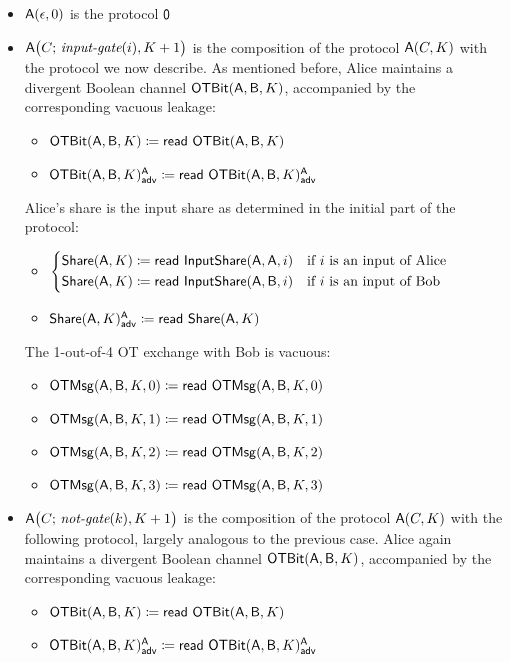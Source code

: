 \begin{itemize}
\item $\mathsf{A}(\epsilon,0)$ is the protocol $\mathsf{0}$
\item $\mathsf{A}\big(C; \, \textit{input-gate}(i),K+1\big)$ is the composition of the protocol $\mathsf{A}(C,K)$ with the protocol we now describe. As mentioned before, Alice maintains a divergent Boolean channel $\mathsf{OTBit}(\mathsf{A},\mathsf{B},K)$, accompanied by the corresponding vacuous leakage:
\begin{itemize}
\item $\mathsf{OTBit}(\mathsf{A},\mathsf{B},K) \coloneqq \mathsf{read} \ \mathsf{OTBit}(\mathsf{A},\mathsf{B},K)$
\item {\color{blue} $\mathsf{OTBit}(\mathsf{A},\mathsf{B},K)^{\mathsf{A}}_{\mathsf{adv}} \coloneqq \mathsf{read} \ \mathsf{OTBit}(\mathsf{A},\mathsf{B},K)^{\mathsf{A}}_{\mathsf{adv}}$}
\end{itemize}
Alice's share is the input share as determined in the initial part of the protocol:
\begin{itemize}
\item $\begin{cases*} \Share(\A,K) \coloneqq \read{\InputShare(\A,\A,i)} & \text{if $i$ is an input of Alice} \\ \Share(\A,K) \coloneqq \read{\InputShare(\A,\B,i)} & \text{if $i$ is an input of Bob} \end{cases*}$
\item {\color{blue} $\mathsf{Share}(\mathsf{A},K)^{\mathsf{A}}_{\mathsf{adv}} \coloneqq \mathsf{read} \ \mathsf{Share}(\mathsf{A},K)$}
\end{itemize}
The 1-out-of-4 OT exchange with Bob is vacuous:
\begin{itemize}
\item $\mathsf{OTMsg}(\mathsf{A},\mathsf{B},K,0) \coloneqq \mathsf{read} \ \mathsf{OTMsg}(\mathsf{A},\mathsf{B},K,0)$
\item $\mathsf{OTMsg}(\mathsf{A},\mathsf{B},K,1) \coloneqq \mathsf{read} \ \mathsf{OTMsg}(\mathsf{A},\mathsf{B},K,1)$
\item $\mathsf{OTMsg}(\mathsf{A},\mathsf{B},K,2) \coloneqq \mathsf{read} \ \mathsf{OTMsg}(\mathsf{A},\mathsf{B},K,2)$
\item $\mathsf{OTMsg}(\mathsf{A},\mathsf{B},K,3) \coloneqq \mathsf{read} \ \mathsf{OTMsg}(\mathsf{A},\mathsf{B},K,3)$
\end{itemize}
\item $\mathsf{A}\big(C; \, \textit{not-gate}(k),K+1\big)$ is the composition of the protocol $\mathsf{A}(C,K)$ with the following protocol, largely analogous to the previous case. Alice again maintains a divergent Boolean channel $\mathsf{OTBit}(\mathsf{A},\mathsf{B},K)$, accompanied by the corresponding vacuous leakage:
\begin{itemize}
\item $\mathsf{OTBit}(\mathsf{A},\mathsf{B},K) \coloneqq \mathsf{read} \ \mathsf{OTBit}(\mathsf{A},\mathsf{B},K)$
\item {\color{blue} $\mathsf{OTBit}(\mathsf{A},\mathsf{B},K)^{\mathsf{A}}_{\mathsf{adv}} \coloneqq \mathsf{read} \ \mathsf{OTBit}(\mathsf{A},\mathsf{B},K)^{\mathsf{A}}_{\mathsf{adv}}$}

\end{itemize}
\end{itemize}
